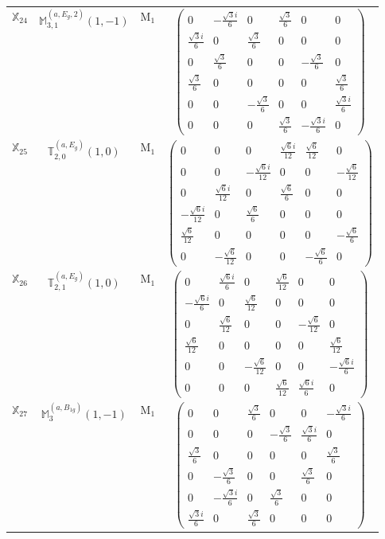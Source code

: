 \documentclass[fleqn,10pt,landscape]{article}
\begin{document}
\begin{itemize}
\begin{center}
\begin{longtable}{c|c|c|c}
$ \mathbb{X}_{24} $ & $\mathbb{M}_{3,1}^{(a,E_{g},2)}(1,-1)$ & M$_{1}$ & $\begin{pmatrix} 0 & - \frac{\sqrt{3} i}{6} & 0 & \frac{\sqrt{3}}{6} & 0 & 0 \\ \frac{\sqrt{3} i}{6} & 0 & \frac{\sqrt{3}}{6} & 0 & 0 & 0 \\ 0 & \frac{\sqrt{3}}{6} & 0 & 0 & - \frac{\sqrt{3}}{6} & 0 \\ \frac{\sqrt{3}}{6} & 0 & 0 & 0 & 0 & \frac{\sqrt{3}}{6} \\ 0 & 0 & - \frac{\sqrt{3}}{6} & 0 & 0 & \frac{\sqrt{3} i}{6} \\ 0 & 0 & 0 & \frac{\sqrt{3}}{6} & - \frac{\sqrt{3} i}{6} & 0 \end{pmatrix}$ \\
$ \mathbb{X}_{25} $ & $\mathbb{T}_{2,0}^{(a,E_{g})}(1,0)$ & M$_{1}$ & $\begin{pmatrix} 0 & 0 & 0 & \frac{\sqrt{6} i}{12} & \frac{\sqrt{6}}{12} & 0 \\ 0 & 0 & - \frac{\sqrt{6} i}{12} & 0 & 0 & - \frac{\sqrt{6}}{12} \\ 0 & \frac{\sqrt{6} i}{12} & 0 & \frac{\sqrt{6}}{6} & 0 & 0 \\ - \frac{\sqrt{6} i}{12} & 0 & \frac{\sqrt{6}}{6} & 0 & 0 & 0 \\ \frac{\sqrt{6}}{12} & 0 & 0 & 0 & 0 & - \frac{\sqrt{6}}{6} \\ 0 & - \frac{\sqrt{6}}{12} & 0 & 0 & - \frac{\sqrt{6}}{6} & 0 \end{pmatrix}$ \\
$ \mathbb{X}_{26} $ & $\mathbb{T}_{2,1}^{(a,E_{g})}(1,0)$ & M$_{1}$ & $\begin{pmatrix} 0 & \frac{\sqrt{6} i}{6} & 0 & \frac{\sqrt{6}}{12} & 0 & 0 \\ - \frac{\sqrt{6} i}{6} & 0 & \frac{\sqrt{6}}{12} & 0 & 0 & 0 \\ 0 & \frac{\sqrt{6}}{12} & 0 & 0 & - \frac{\sqrt{6}}{12} & 0 \\ \frac{\sqrt{6}}{12} & 0 & 0 & 0 & 0 & \frac{\sqrt{6}}{12} \\ 0 & 0 & - \frac{\sqrt{6}}{12} & 0 & 0 & - \frac{\sqrt{6} i}{6} \\ 0 & 0 & 0 & \frac{\sqrt{6}}{12} & \frac{\sqrt{6} i}{6} & 0 \end{pmatrix}$ \\
$ \mathbb{X}_{27} $ & $\mathbb{M}_{3}^{(a,B_{1g})}(1,-1)$ & M$_{1}$ & $\begin{pmatrix} 0 & 0 & \frac{\sqrt{3}}{6} & 0 & 0 & - \frac{\sqrt{3} i}{6} \\ 0 & 0 & 0 & - \frac{\sqrt{3}}{6} & \frac{\sqrt{3} i}{6} & 0 \\ \frac{\sqrt{3}}{6} & 0 & 0 & 0 & 0 & \frac{\sqrt{3}}{6} \\ 0 & - \frac{\sqrt{3}}{6} & 0 & 0 & \frac{\sqrt{3}}{6} & 0 \\ 0 & - \frac{\sqrt{3} i}{6} & 0 & \frac{\sqrt{3}}{6} & 0 & 0 \\ \frac{\sqrt{3} i}{6} & 0 & \frac{\sqrt{3}}{6} & 0 & 0 & 0 \end{pmatrix}$ \\

\end{longtable}
\end{center}
\end{itemize}
\end{document}
